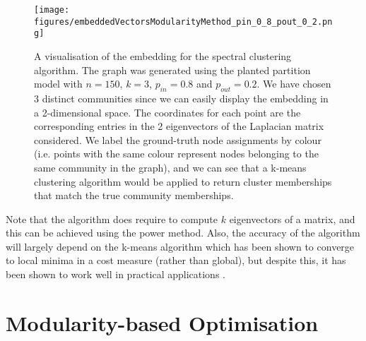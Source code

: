 \begin{figure}
	\centering
	\texttt{[image: figures/embeddedVectorsModularityMethod\_pin\_0\_8\_pout\_0\_2.png]}
	\caption[Visualisation of spectral clustering embedding.]{\label{fig:SpectralClusteringEmbeddingVisualisation} A visualisation of the embedding for the spectral clustering algorithm. The graph was generated using the planted partition model with $n=150$, $k=3$, $p_{in}=0.8$ and $p_{out}=0.2$. We have chosen $3$ distinct communities since we can easily display the embedding in a 2-dimensional space. The coordinates for each point are the corresponding entries in the 2 eigenvectors of the Laplacian matrix considered. We label the ground-truth node assignments by colour (i.e. points with the same colour represent nodes belonging to the same community in the graph), and we can see that a k-means clustering algorithm would be applied to return cluster memberships that match the true community memberships.}
\end{figure}

Note that the algorithm does require to compute $k$ eigenvectors of a matrix, and this can be achieved using the power method.
Also, the accuracy of the algorithm will largely depend on the k-means algorithm which has been shown to converge to local minima in a cost measure (rather than global), but despite this, it has been shown to work well in practical applications \cite{Lux06,For10}.


\section{Modularity-based Optimisation}
\label{sec:modularityBasedOptimisation}
 
